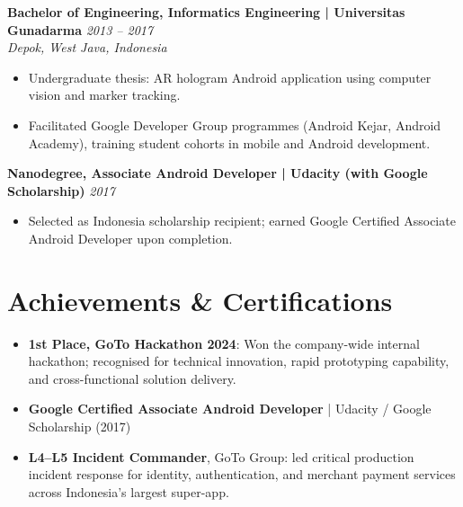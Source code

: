 \documentclass[10pt]{article}
\begin{document}
\textbf{Bachelor of Engineering, Informatics Engineering | Universitas Gunadarma} \hfill \textit{2013 -- 2017}\\
\textit{Depok, West Java, Indonesia}
\begin{itemize}
\item Undergraduate thesis: AR hologram Android application using computer vision and marker tracking.
\item Facilitated Google Developer Group programmes (Android Kejar, Android Academy), training student cohorts in mobile and Android development.
\end{itemize}

\vspace{2pt}
\textbf{Nanodegree, Associate Android Developer | Udacity (with Google Scholarship)} \hfill \textit{2017}
\begin{itemize}
\item Selected as Indonesia scholarship recipient; earned Google Certified Associate Android Developer upon completion.
\end{itemize}

\section*{Achievements \& Certifications}
\begin{itemize}
\item \textbf{1st Place, GoTo Hackathon 2024}: Won the company-wide internal hackathon; recognised for technical innovation, rapid prototyping capability, and cross-functional solution delivery.
\item \textbf{Google Certified Associate Android Developer} | Udacity / Google Scholarship (2017)
\item \textbf{L4--L5 Incident Commander}, GoTo Group: led critical production incident response for identity, authentication, and merchant payment services across Indonesia's largest super-app.
\end{itemize}
\end{document}
